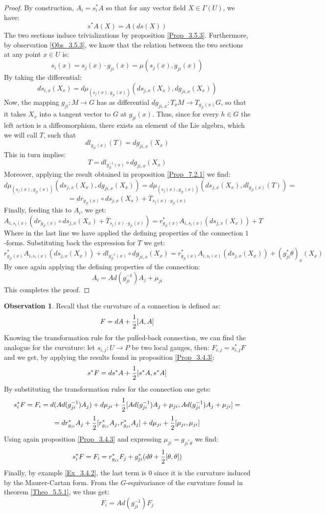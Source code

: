 \documentclass[12pt,a4paper]{report}
\theoremstyle{definition}
\theoremstyle{Theorem}
\theoremstyle{definition}
\theoremstyle{definition}
\newtheorem{Obs}[Def]{Observation}
\begin{document}
	\begin{proof}
		By construction, $A_i=s_i^*A$ so that for any vector field $X\in \Gamma(U)$, we have:
		$$s^*A(X)=A(ds(X))$$
		The two sections induce trivializations by proposition \ref{Prop_3.5.3}. Furthermore, by observation \ref{Obs_3.5.3}, we know that the relation between the two sections at any point $x\in U$ is:
		$$s_i(x)=s_j(x)\cdot g_{ji}(x)=\mu(s_j(x),g_{ji}(x))$$
		By taking the differential:
		$$ds_{i,x}(X_x)=d\mu_{(s_{j}(x), g_{ji}(x))}(ds_{j,x}(X_x),dg_{ji,x}(X_x))$$
		Now, the mapping $g_{ji}:M\rightarrow G$ has as differential $dg_{ji,x}:T_xM\rightarrow T_{g_{ji}(x)}G$, so that it takes $X_x$ into a tangent vector to $G$ at $g_{ji}(x)$. Thus, since for every $h\in G$ the left action is a diffeomorphism, there exists an element of the Lie algebra, which we will call $T$, such that 
		$$dl_{g_{ji}(x)}(T)=dg_{ji,x}(X_x)$$
		This in turn implies:
		$$T=dl_{g^{-1}_{ji}(x)}\circ dg_{ji,x}(X_x)$$
		Moreover, applying the result obtained in proposition \ref{Prop_7.2.1} we find:
		$$d\mu_{(s_{j}(x), g_{ji}(x))}(ds_{j,x}(X_x),dg_{ji,x}(X_x))=d\mu_{(s_{j}(x), g_{ji}(x))}(ds_{j,x}(X_x),dl_{g_{ji}(x)}(T))=$$
		$$=dr_{g_{ji}(x)}\circ ds_{j,x}(X_x)+\overline{T}_{s_{j}(x)\cdot g_{ji}(x)}$$
		Finally, feeding this to $A_i$, we get:
		$$A_{i,s_i(x)}(dr_{g_{ji}(x)}\circ ds_{j,x}(X_x)+\overline{T}_{s_{j}(x)\cdot g_{ji}(x)})=r^*_{g_{ji}(x)}A_{i,{s_i(x)}}(ds_{j,x}(X_x))+T$$
		Where in the last line we have applied the defining properties of the connection $1$-forms. Substituting back the expression for $T$ we get:
		$$r^*_{g_{ji}(x)}A_{i,{s_i(x)}}(ds_{j,x}(X_x))+dl_{g^{-1}_{ji}(x)}\circ dg_{ji,x}(X_x)=r^*_{g_{ji}(x)}A_{i,{s_i(x)}}(ds_{j,x}(X_x))+(g^*_{ji}\theta)_x(X_x)$$
		By once again applying the defining properties of the connection:
		$$A_i=Ad(g_{ji}^{-1})A_j+\mu_{ji}$$
		This completes the proof.
	\end{proof}
	\begin{Obs}\label{Obs_7.2.2}
		Recall that the curvature of a connection is defined as:
		$$F=dA+{1\over 2}[A,A]$$
		Knowing the transformation rule for the pulled-back connection, we can find the analogue for the curvature: let $s_{i,j}:U\rightarrow P$ be two local gauges, then: $F_{i,j}=s_{i,j}^*F$ and we get, by applying the results found in proposition \ref{Prop_3.4.3}:
		$$s^*F=ds^*A+{1\over 2}[s^*A,s^*A]$$
		By substituting the transformation rules for the connection one gets:
		$$s_i^*F=F_i=d(Ad(g_{ji}^{-1})A_j)+d\mu_{ji}+{1\over 2}[Ad(g_{ji}^{-1})A_j+\mu_{ji},Ad(g_{ji}^{-1})A_j+\mu_{ji}]=$$
		$$=dr^*_{g_{ji}}A_j+{1\over 2}[r^*_{g_{ji}}A_j,r^*_{g_{ji}}A_j]+d\mu_{ji}+{1\over 2}[\mu_{ji},\mu_{ji}]$$
		Using again proposition \ref{Prop_3.4.3} and expressing $\mu_{ji}=g_{ji^*\theta}$ we find:
		$$s_i^*F=F_i=r^*_{g_{ji}}F_j+g_{ji}^*(d\theta+{1\over 2}[\theta,\theta])$$
		Finally, by example \ref{Ex_3.4.2}, the last term is 0 since it is the curvature induced by the Maurer-Cartan form. From the $G$-equivariance of the curvature found in theorem \ref{Theo_5.5.1}, we thus get:
		$$F_i=Ad(g_{ji}^{-1})F_j$$
	\end{Obs}
\end{document}
